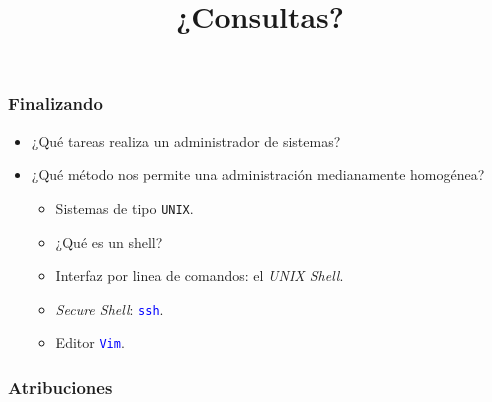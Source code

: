 \documentclass[11pt,a4paper,spanish]{beamer}
\newcommand{\codeword}[1]{\mbox{\texttt{\textcolor{blue}{#1}}}}
\begin{document}
\begin{frame}

    \frametitle{Finalizando}

\begin{itemize}

    \item ¿Qué tareas realiza un administrador de sistemas?
    \item ¿Qué método nos permite una administración medianamente homogénea?
        \begin{itemize}
            \item Sistemas de tipo \texttt{UNIX}.
            \item ¿Qué es un shell?
            \item Interfaz por linea de comandos: el \emph{UNIX Shell}.
            \item \emph{Secure Shell}: \codeword{ssh}.
            \item Editor \codeword{Vim}.
        \end{itemize}

\end{itemize}

\end{frame}

\begin{frame}

\title{¿Consultas?}
\maketitle

\end{frame}

\setcounter{lastPage}{\number\value{page}}

\begin{frame}%

\frametitle{Atribuciones}


\tiny

\end{frame}

\setcounter{page}{\number\value{lastPage}}
\end{document}
